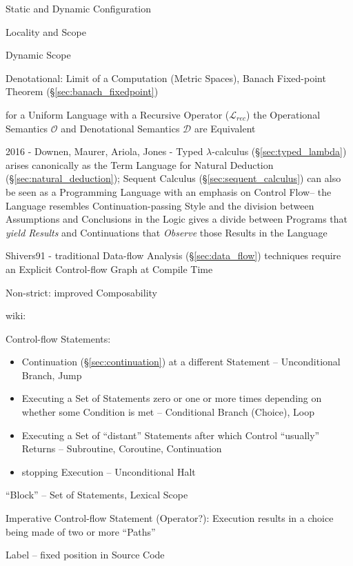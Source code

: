 Static and Dynamic Configuration

Locality and Scope

Dynamic Scope

Denotational: Limit of a Computation (Metric Spaces), Banach
Fixed-point Theorem (\S\ref{sec:banach_fixedpoint}) %

for a Uniform Language with a Recursive Operator ($\mathcal{L}_{rec}$)
the Operational Semantics $\mathcal{O}$ and Denotational Semantics
$\mathcal{D}$ are Equivalent

2016 - Downen, Maurer, Ariola, Jones - Typed $\lambda$-calculus
(\S\ref{sec:typed_lambda}) arises canonically as the Term Language for Natural
Deduction (\S\ref{sec:natural_deduction}); Sequent Calculus
(\S\ref{sec:sequent_calculus}) can also be seen as a Programming Language with
an emphasis on Control Flow-- the Language resembles Continuation-passing Style
and the division between Assumptions and Conclusions in the Logic gives a
divide between Programs that \emph{yield Results} and Continuations that
\emph{Observe} those Results in the Language


\asterism


Shivers91 - traditional Data-flow Analysis (\S\ref{sec:data_flow})
techniques require an Explicit Control-flow Graph at Compile Time

Non-strict: improved Composability %


wiki:

Control-flow Statements:
\begin{itemize}
  \item Continuation (\S\ref{sec:continuation}) at a different
    Statement -- Unconditional Branch, Jump
  \item Executing a Set of Statements zero or one or more times
    depending on whether some Condition is met -- Conditional Branch
    (Choice), Loop
  \item Executing a Set of ``distant'' Statements after which Control
    ``usually'' Returns -- Subroutine, Coroutine, Continuation
  \item stopping Execution -- Unconditional Halt
\end{itemize}

``Block'' -- Set of Statements, Lexical Scope %

Imperative Control-flow Statement (Operator?): Execution results in a
choice being made of two or more ``Paths''

Label -- fixed position in Source Code

